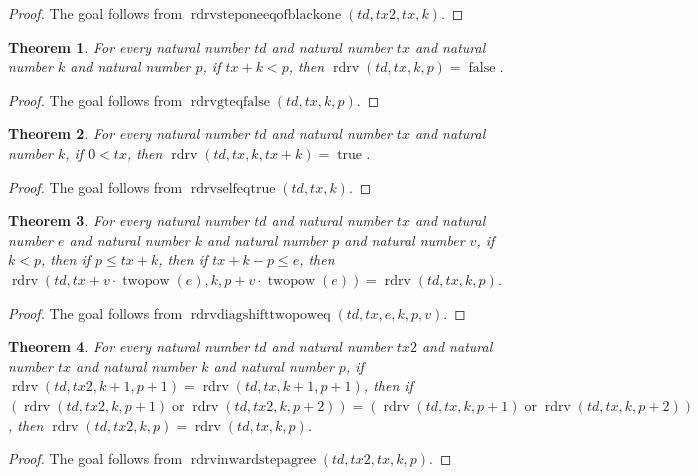 \documentclass[11pt]{article}
\newtheorem{theorem}{Theorem}[section]
\theoremstyle{definition}
\begin{document}
\begin{proof}
The goal follows from \(\operatorname{rdrvsteponeeqofblackone}(td, tx2, tx, k)\).
\end{proof}
\begin{theorem}
\label{ll:paper:rdrv-gt-eq-false}
For every natural number \(td\) and natural number \(tx\) and natural number \(k\) and natural number \(p\), if \(tx + k < p\), then \(\operatorname{rdrv}(td, tx, k, p) = \operatorname{false}\).
\end{theorem}
\begin{proof}
The goal follows from \(\operatorname{rdrvgteqfalse}(td, tx, k, p)\).
\end{proof}
\begin{theorem}
\label{ll:paper:rdrv-self-eq-true}
For every natural number \(td\) and natural number \(tx\) and natural number \(k\), if \(0 < tx\), then \(\operatorname{rdrv}(td, tx, k, tx + k) = \operatorname{true}\).
\end{theorem}
\begin{proof}
The goal follows from \(\operatorname{rdrvselfeqtrue}(td, tx, k)\).
\end{proof}
\begin{theorem}
\label{ll:paper:rdrv-diag-shift-twopow-eq}
For every natural number \(td\) and natural number \(tx\) and natural number \(e\) and natural number \(k\) and natural number \(p\) and natural number \(v\), if \(k < p\), then if \(p \le tx + k\), then if \(tx + k - p \le e\), then \(\operatorname{rdrv}(td, tx + v \cdot \operatorname{twopow}(e), k, p + v \cdot \operatorname{twopow}(e)) = \operatorname{rdrv}(td, tx, k, p)\).
\end{theorem}
\begin{proof}
The goal follows from \(\operatorname{rdrvdiagshifttwopoweq}(td, tx, e, k, p, v)\).
\end{proof}
\begin{theorem}
\label{ll:paper:rdrv-inward-step-agree}
For every natural number \(td\) and natural number \(tx2\) and natural number \(tx\) and natural number \(k\) and natural number \(p\), if \(\operatorname{rdrv}(td, tx2, k + 1, p + 1) = \operatorname{rdrv}(td, tx, k + 1, p + 1)\), then if \((\operatorname{rdrv}(td, tx2, k, p + 1) \operatorname{or} \operatorname{rdrv}(td, tx2, k, p + 2)) = (\operatorname{rdrv}(td, tx, k, p + 1) \operatorname{or} \operatorname{rdrv}(td, tx, k, p + 2))\), then \(\operatorname{rdrv}(td, tx2, k, p) = \operatorname{rdrv}(td, tx, k, p)\).
\end{theorem}
\begin{proof}
The goal follows from \(\operatorname{rdrvinwardstepagree}(td, tx2, tx, k, p)\).
\end{proof}
\end{document}

